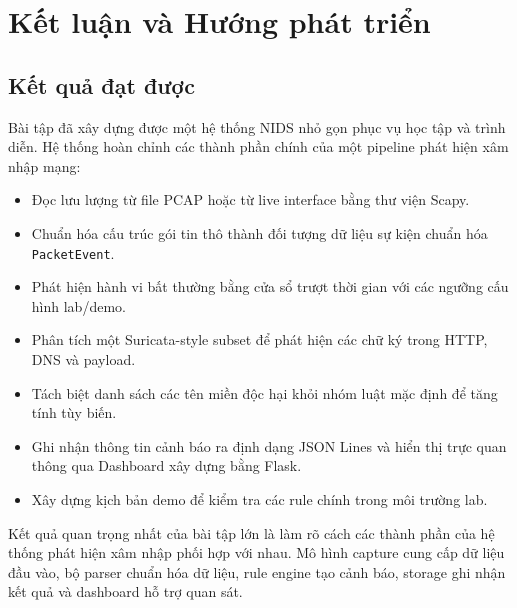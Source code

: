 \chapter{Kết luận và Hướng phát triển}

\section{Kết quả đạt được}
Bài tập đã xây dựng được một hệ thống NIDS nhỏ gọn phục vụ học tập và trình diễn. Hệ thống hoàn chỉnh các thành phần chính của một pipeline phát hiện xâm nhập mạng:
\begin{itemize}
    \item Đọc lưu lượng từ file PCAP hoặc từ live interface bằng thư viện Scapy.
    \item Chuẩn hóa cấu trúc gói tin thô thành đối tượng dữ liệu sự kiện chuẩn hóa \texttt{PacketEvent}.
    \item Phát hiện hành vi bất thường bằng cửa sổ trượt thời gian với các ngưỡng cấu hình lab/demo.
    \item Phân tích một Suricata-style subset để phát hiện các chữ ký trong HTTP, DNS và payload.
    \item Tách biệt danh sách các tên miền độc hại khỏi nhóm luật mặc định để tăng tính tùy biến.
    \item Ghi nhận thông tin cảnh báo ra định dạng JSON Lines và hiển thị trực quan thông qua Dashboard xây dựng bằng Flask.
    \item Xây dựng kịch bản demo để kiểm tra các rule chính trong môi trường lab.
\end{itemize}

Kết quả quan trọng nhất của bài tập lớn là làm rõ cách các thành phần của hệ thống phát hiện xâm nhập phối hợp với nhau. Mô hình capture cung cấp dữ liệu đầu vào, bộ parser chuẩn hóa dữ liệu, rule engine tạo cảnh báo, storage ghi nhận kết quả và dashboard hỗ trợ quan sát.

